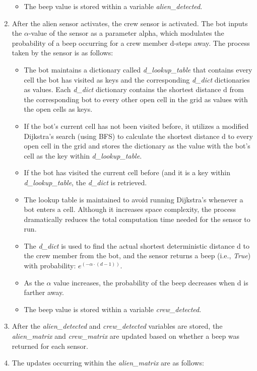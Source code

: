 \documentclass[11pt]{article}
\begin{document}
\begin{enumerate}
\begin{itemize}
        \item The beep value is stored within a variable \emph{alien\_detected}.
    \end{itemize}
    \item After the alien sensor activates, the crew sensor is activated. The bot inputs the $\alpha$-value of the sensor as a parameter alpha, which modulates the probability of a beep occurring for a crew member d-steps away. The process taken by the sensor is as follows:
    \begin{itemize}
        \item The bot maintains a dictionary called \emph{d\_lookup\_table} that contains every cell the bot has visited as keys and the corresponding \emph{d\_dict} dictionaries as values. Each \emph{d\_dict} dictionary contains the shortest distance d from the corresponding bot to every other open cell in the grid as values with the open cells as keys.
        \item If the bot's current cell has not been visited before, it utilizes a modified Dijkstra's search (using BFS) to calculate the shortest distance d to every open cell in the grid and stores the dictionary as the value with the bot's cell as the key within \emph{d\_lookup\_table}.
        \item If the bot has visited the current cell before (and it is a key within \emph{d\_lookup\_table}, the \emph{d\_dict} is retrieved.
        \item The lookup table is maintained to avoid running Dijkstra's whenever a bot enters a cell. Although it increases space complexity, the process dramatically reduces the total computation time needed for the sensor to run.
        \item The \emph{d\_dict} is used to find the actual shortest deterministic distance d to the crew member from the bot, and the sensor returns a beep (i.e., \emph{True}) with probability: $e^{(-\alpha \cdot (d - 1))}$.
        \item As the $\alpha$ value increases, the probability of the beep decreases when d is farther away.
        \item The beep value is stored within a variable \emph{crew\_detected}.
    \end{itemize}
    \item After the \emph{alien\_detected} and \emph{crew\_detected} variables are stored, the \emph{alien\_matrix} and \emph{crew\_matrix} are updated based on whether a beep was returned for each sensor.
    \item The updates occurring within the \emph{alien\_matrix} are as follows:

\end{enumerate}
\end{document}
